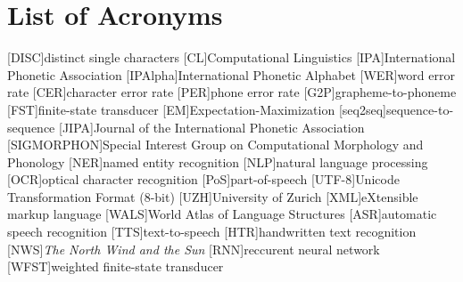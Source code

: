 {}
\chapter*{List of Acronyms}
\begin{acronym}[SIGMORPHON]\itemsep3pt
[DISC]{distinct single characters}
[CL]{Computational Linguistics}
[IPA]{International Phonetic Association}
[IPAlpha]{International Phonetic Alphabet}
[WER]{word error rate}
[CER]{character error rate}
[PER]{phone error rate}
[G2P]{grapheme-to-phoneme}
[FST]{finite-state transducer}
[EM]{Expectation-Maximization}
[seq2seq]{sequence-to-sequence} 
[JIPA]{Journal of the International Phonetic Association}
[SIGMORPHON]{Special Interest Group on Computational  Morphology and Phonology}
[NER]{named entity recognition}
[NLP]{natural language processing}
[OCR]{optical character recognition}
[PoS]{part-of-speech}
[UTF-8]{Unicode Transformation Format (8-bit)}
[UZH]{University of Zurich}
[XML]{eXtensible markup language}
[WALS]{World Atlas of Language Structures}
[ASR]{automatic speech recognition}
[TTS]{text-to-speech}
[HTR]{handwritten text recognition}
[NWS]{\textit{The North Wind and the Sun}}
[RNN]{reccurent neural network}
[WFST]{weighted finite-state transducer}
\end{acronym}